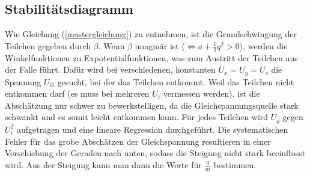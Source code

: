\documentclass[a4paper,12pt]{article}
\begin{document}
\subsection{Stabilitätsdiagramm}
Wie Gleichung (\ref{mastergleichung}) zu entnehmen, ist die Grundschwingung der Teilchen gegeben durch $β$.
Wenn $β$ imaginär ist ($ \Leftrightarrow a + \frac12q^2 >0$), werden die Winkelfunktionen zu Expotentialfunktionen, was zum Austritt der Teilchen aus der Falle führt.
Dafür wird bei verschiedenen, konstanten $U_x = U_y = U_z$ die Spannung $U_G$ gesucht, bei der das Teilchen entkommt.
Weil das Teilchen nicht entkommen darf (es muss bei mehreren $U_i$ vermessen werden), ist die Abschätzung nur schwer zu bewerkstelligen, da die Gleichspannungsquelle stark schwankt und es somit leicht entkommen kann.
Für jedes Teilchen wird $U_g$ gegen $U_i^2$ aufgetragen und eine lineare Regression durchgeführt.
Die systematischen Fehler für das grobe Abschätzen der Gleichspannung resultieren in einer Verschiebung der Geraden nach unten, sodass die Steigung nicht stark beeinflusst wird.
Aus der Steigung kann man dann die Werte für $\frac{q}{m}$ bestimmen.
\end{document}
